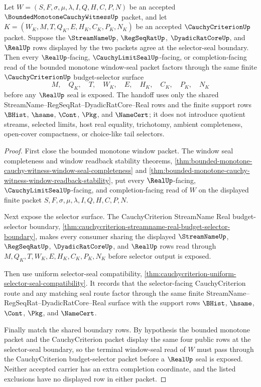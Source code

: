 \begin{theorem}
\label{thm:bounded-monotone-cauchy-witness-cauchycriterion-selector-handoff}
Let $W=(S,F,\sigma,\mu,\lambda,I,Q,H,C,P,N)$ be an accepted $\BoundedMonotoneCauchyWitnessUp$ packet, and let $K=(W_K,M,T,Q_K,E,H_K,C_K,P_K,N_K)$ be an accepted $\CauchyCriterionUp$ packet. Suppose the $\StreamNameUp$, $\RegSeqRatUp$, $\DyadicRatCoreUp$, and $\RealUp$ rows displayed by the two packets agree at the selector-seal boundary. Then every $\RealUp$-facing, $\CauchyLimitSealUp$-facing, or completion-facing read of the bounded monotone window-seal packet factors through the same finite $\CauchyCriterionUp$ budget-selector surface
$$
M,\quad Q_K,\quad T,\quad W_K,\quad E,\quad H_K,\quad C_K,\quad P_K,\quad N_K
$$
before any $\RealUp$ seal is exposed. The handoff uses only the shared StreamName--RegSeqRat--DyadicRatCore--Real rows and the finite support rows $\BHist$, $\hsame$, $\Cont$, $\Pkg$, and $\NameCert$; it does not introduce quotient streams, selected limits, host real equality, trichotomy, ambient completeness, open-cover compactness, or choice-like tail selectors.
\end{theorem}
\begin{proof}
First close the bounded monotone window packet. The window seal completeness and window readback stability theorems, \autoref{thm:bounded-monotone-cauchy-witness-window-seal-completeness} and \autoref{thm:bounded-monotone-cauchy-witness-window-readback-stability}, put every $\RealUp$-facing, $\CauchyLimitSealUp$-facing, and completion-facing read of $W$ on the displayed finite packet $S,F,\sigma,\mu,\lambda,I,Q,H,C,P,N$.

Next expose the selector surface. The CauchyCriterion StreamName Real budget-selector boundary, \autoref{thm:cauchycriterion-streamname-real-budget-selector-boundary}, makes every consumer sharing the displayed $\StreamNameUp$, $\RegSeqRatUp$, $\DyadicRatCoreUp$, and $\RealUp$ rows read through $M,Q_K,T,W_K,E,H_K,C_K,P_K,N_K$ before selector output is exposed.

Then use uniform selector-seal compatibility, \autoref{thm:cauchycriterion-uniform-selector-seal-compatibility}. It records that the selector-facing CauchyCriterion route and any matching seal route factor through the same finite StreamName--RegSeqRat--DyadicRatCore--Real surface with the support rows $\BHist$, $\hsame$, $\Cont$, $\Pkg$, and $\NameCert$.

Finally match the shared boundary rows. By hypothesis the bounded monotone packet and the CauchyCriterion packet display the same four public rows at the selector-seal boundary, so the terminal window-seal read of $W$ must pass through the CauchyCriterion budget-selector packet before a $\RealUp$ seal is exposed. Neither accepted carrier has an extra completion coordinate, and the listed exclusions have no displayed row in either packet.
\end{proof}

